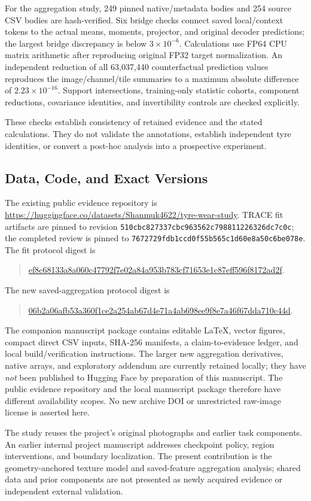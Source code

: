 For the aggregation study, 249 pinned native/metadata bodies and 254 source CSV bodies are hash-verified. Six bridge checks connect saved local/context tokens to the actual means, moments, projector, and original decoder predictions; the largest bridge discrepancy is below $3\times10^{-6}$. Calculations use FP64 CPU matrix arithmetic after reproducing original FP32 target normalization. An independent reduction of all 63,037,440 counterfactual prediction values reproduces the image/channel/tile summaries to a maximum absolute difference of $2.23\times10^{-16}$. Support intersections, training-only statistic cohorts, component reductions, covariance identities, and invertibility controls are checked explicitly.

These checks establish consistency of retained evidence and the stated calculations. They do not validate the annotations, establish independent tyre identities, or convert a post-hoc analysis into a prospective experiment.

\subsection{Data, Code, and Exact Versions}
The existing public evidence repository is \url{https://huggingface.co/datasets/Shanmuk4622/tyre-wear-study}. TRACE fit artifacts are pinned to revision \nolinkurl{510cbc827337cbc963562c798811226326dc7c0c}; the completed review is pinned to \nolinkurl{7672729fdb1ccd0f55b565c1d60e8a50c6be078e}. The fit protocol digest is
\begin{quote}\footnotesize\url{ef8c68133a8a060c47792f7e02a84a953b783cf71653e1c87eff596f8172ad2f}.
\end{quote}
The new saved-aggregation protocol digest is
\begin{quote}\footnotesize\url{06b2a06afb53a360f1ce2a254ab67d4e71a4ab698ee9f8e7a46f67dda710c44d}.
\end{quote}
The companion manuscript package contains editable LaTeX, vector figures, compact direct CSV inputs, SHA-256 manifests, a claim-to-evidence ledger, and local build/verification instructions. The larger new aggregation derivatives, native arrays, and exploratory addendum are currently retained locally; they have \emph{not} been published to Hugging Face by preparation of this manuscript. The public evidence repository and the local manuscript package therefore have different availability scopes. No new archive DOI or unrestricted raw-image license is asserted here.

The study reuses the project's original photographs and earlier task components. An earlier internal project manuscript addresses checkpoint policy, region interventions, and boundary localization. The present contribution is the geometry-anchored texture model and saved-feature aggregation analysis; shared data and prior components are not presented as newly acquired evidence or independent external validation.
